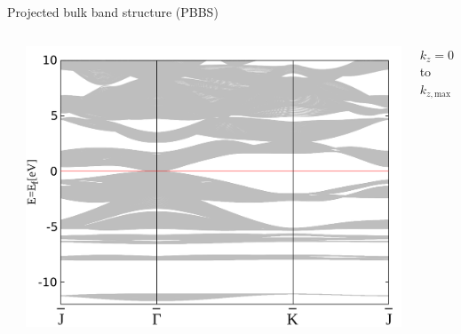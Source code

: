 \begin{frame}[fragile]{Projected bulk band structure (PBBS)}
\begin{columns}
\begin{column}{.33\linewidth}
		\end{column}
		\begin{column}{.33\linewidth}
			\centering 
			\includegraphics[width=\linewidth]{andere_bilder/bulk_-12_10.pdf}
		\end{column}
		\begin{column}{.165\linewidth} \scriptsize{
				${k_z=0}$ to $k_{z,\text{max}}$ }
		\end{column}
	\end{columns}	
\end{frame}


